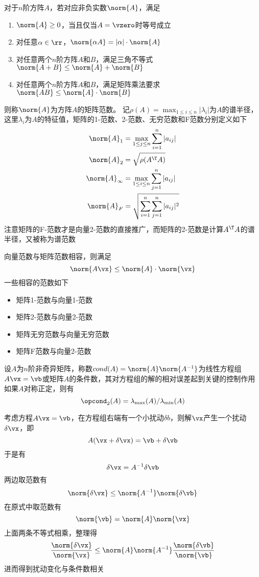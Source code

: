\begin{definition}[矩阵的范数]
    对于$n$阶方阵$A$，若对应非负实数$\norm{A}$，满足
    \begin{enumerate}
        \item $\norm{A}\geq 0$，当且仅当$A=\vzero$时等号成立
        \item 对任意$\alpha\in\rr$，$\norm{\alpha A}=|\alpha|\cdot\norm{A}$
        \item 对任意两个$n$阶方阵$A$和$B$，满足三角不等式$\norm{A+B}\leq\norm{A}+\norm{B}$
        \item 对任意两个$n$阶方阵$A$和$B$，满足矩阵乘法要求$\norm{AB}\leq\norm{A}\cdot\norm{B}$
    \end{enumerate}
    则称$\norm{A}$为方阵$A$的矩阵范数。
    记$\rho(A)=\max_{1\leq i\leq n}|\lambda_i|$为$A$的谱半径，这里$\lambda_i$为$A$的特征值，矩阵的1-范数、2-范数、无穷范数和F范数分别定义如下
    \[\begin{aligned}
        \norm{A}_1&=\max_{1\leq j\leq n}\sum_{i=1}^n|a_{ij}|\\
        \norm{A}_2&=\sqrt{\rho(A^\T A)}\\
        \norm{A}_\infty&=\max_{1\leq i\leq n}\sum_{j=1}^n|a_{ij}|\\
        \norm{A}_F&=\sqrt{\sum_{i=1}^n\sum_{j=1}^n|a_{ij}|^2}
    \end{aligned}\]
    注意矩阵的F-范数才是向量2-范数的直接推广，而矩阵的2-范数是计算$A^\T A$的谱半径，又被称为谱范数
\end{definition}
\begin{definition}[向量范数与矩阵范数相容]
向量范数与矩阵范数相容，则满足
\[\norm{A\vx}\leq\norm{A}\cdot\norm{\vx}\]
一些相容的范数如下
\begin{itemize}
    \item 矩阵1-范数与向量1-范数
    \item 矩阵2-范数与向量2-范数
    \item 矩阵无穷范数与向量无穷范数
    \item 矩阵F范数与向量2-范数
\end{itemize}
\end{definition}

\begin{definition}[条件数]
    设$A$为$n$阶非奇异矩阵，称数$\mathop{cond}(A)=\norm{A}\norm{A^{-1}}$为线性方程组$A\vx=\vb$或矩阵$A$的条件数，其对方程组的解的相对误差起到关键的控制作用\\
    如果$A$对称正定，则有
    \[\opcond_2(A)=\lambda_{\max}(A)/\lambda_{\min}(A)\]
\end{definition}
\begin{analysis}
考虑方程$A\vx=\vb$，在方程组右端有一个小扰动$\delta b$，则解$\vx$产生一个扰动$\delta\vx$，即
\[A(\vx+\delta\vx)=\vb+\delta\vb\]
于是有
\[\delta\vx=A^{-1}\delta\vb\]
两边取范数有
\[\norm{\delta\vx}\leq\norm{A^{-1}}\norm{\delta\vb}\]
在原式中取范数有
\[\norm{\vb}=\norm{A}\norm{\vx}\]
上面两条不等式相乘，整理得
\[\frac{\norm{\delta\vx}}{\norm{\vx}}\leq\norm{A}\norm{A^{-1}}\frac{\norm{\delta\vb}}{\norm{\vb}}\]
进而得到扰动变化与条件数相关
\end{analysis}


